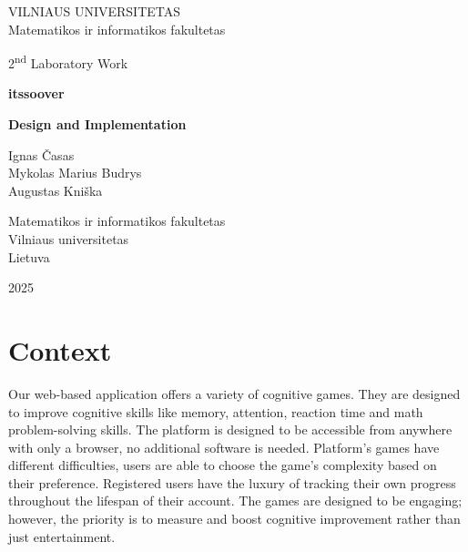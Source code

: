 \documentclass[11pt,a4paper]{article}
\begin{document}

\begin{titlepage}
    \centering
    \thispagestyle{empty}
    
    {\Large VILNIAUS UNIVERSITETAS\\
    Matematikos ir informatikos fakultetas}\par
    
    \vspace{3cm} %
    
    {\Large 2\textsuperscript{nd} Laboratory Work}\par
    \vspace{0.5cm}
    {\Large \textbf{itssoover}}\par
    {\Large \textbf{Design and Implementation}}\par
    
    \vspace{3cm}
    
    {\large
    Ignas Časas\\
    Mykolas Marius Budrys\\
    Augustas Kniška
    }\par
    
    \vspace{8cm}
    
    {\large
    Matematikos ir informatikos fakultetas\\
    Vilniaus universitetas\\
    Lietuva
    }\par
    
    \vfill

    \large 2025
    
\end{titlepage}

\tableofcontents
\newpage

\section{Context}
Our web-based application offers a variety of cognitive games. They are designed to improve cognitive skills like memory, attention, reaction time and math problem-solving skills. The platform is designed to be  accessible from anywhere with only a browser, no additional software is needed. Platform's games have different difficulties, users are able to choose the game's complexity based on their preference. Registered users have the luxury of tracking their own progress throughout the lifespan of their account. The games are designed to be engaging; however, the priority is to measure and boost cognitive improvement rather than just entertainment.
\end{document}
